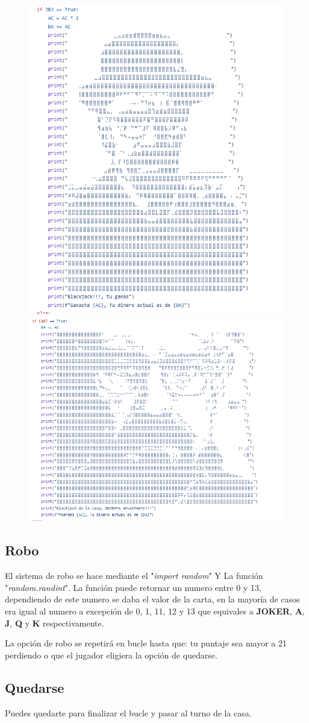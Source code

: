 \begin{figure}[h]
    \centering
    \includegraphics[width=0.4\linewidth]{Imagenes/BlackJack J.PNG}
    \hspace{0,1cm}
    \includegraphics[width=0.5\linewidth]{Imagenes/BlackJack C.PNG}
\end{figure}

\subsection{Robo}

El sistema de robo se hace mediante el "\textit{import random}" Y La función "\textit{random.randint}". La función puede retornar un numero entre 0 y 13, dependiendo de este numero se daba el valor de la carta, en la mayoría de casos era igual al numero a excepción de 0, 1, 11, 12 y 13 que equivales a \textbf{JOKER}, \textbf{A}, \textbf{J}, \textbf{Q} y \textbf{K} respectivamente.

La opción de robo se repetirá en bucle hasta que: tu puntaje sea mayor a 21 perdiendo o que el jugador eligiera la opción de quedarse.

\subsection{Quedarse}

Puedes quedarte para finalizar el bucle y pasar al turno de la casa.

\newpage